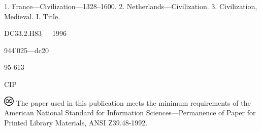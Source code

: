 \documentclass[
]{book}
\begin{document}
1. France---Civilization---1328--1600. 2. Netherlands---Civilization. 3.
Civilization, Medieval. I. Title.

DC33.2.H83~~~1996

944'025---dc20

95-613

CIP

\includegraphics{include/html/images/5_1.png}
The paper used in this publication meets the minimum requirements of the
American National Standard for Information Sciences---Permanence of
Paper for Printed Library Materials, ANSI Z39.48-1992.

\tableofcontents

\frontmatter





\mainmatter
















\backmatter



\end{document}
